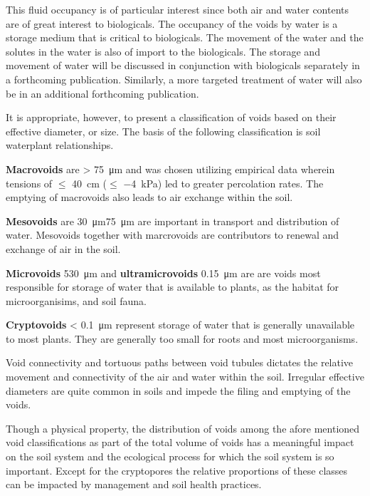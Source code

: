 \documentclass[a5paper]{report}
\begin{document}
This fluid occupancy is of particular interest since both air and water contents are of great interest to biologicals. The occupancy of the voids by water is a storage medium that is critical to biologicals. The movement of the water and the solutes in the water is also of import to the biologicals. The storage and movement of water will be discussed in conjunction with biologicals separately in a forthcoming publication. Similarly, a more targeted treatment of water will also be in an additional forthcoming publication.  

It is appropriate, however, to present a classification of voids based on their effective diameter, or size. The basis of the following classification is soil water\textemdash{}plant relationships.  

\textbf{Macrovoids} are \textgreater{} \SI{75}{\micro\metre} and was chosen utilizing empirical data wherein tensions of $\leq$ \SI{40}{\centi\metre} ($\leq$ \SI{-4}{kPa}) led to greater percolation rates. The emptying of macrovoids also leads to air exchange within the soil.  

\textbf{Mesovoids} are \SI{30}{\micro\metre}\textemdash \SI{75}{\micro\metre} are important in transport and distribution of water. Mesovoids together with marcrovoids are contributors to renewal and exchange of air in the soil.  

\textbf{Microvoids} \SI{5}{}\textemdash \SI{30}{\micro\metre} and \textbf{ultramicrovoids} \SI{0.1}{}\textemdash \SI{5}{\micro\metre} are are voids most responsible for storage of water that is available to plants, as the habitat for microorganisims, and soil fauna.  

\textbf{Cryptovoids} \textless{} \SI{0.1}{\micro\metre} represent storage of water that is generally unavailable to most plants. They are generally too small for roots and most microorganisms.  

Void connectivity and tortuous paths between void tubules dictates the relative movement and connectivity of the air and water within the soil. Irregular effective diameters are quite common in soils and impede the filing and emptying of the voids.  

Though a physical property, the distribution of voids among the afore mentioned void classifications as part of the total volume of voids has a meaningful impact on the soil system and the ecological process for which the soil system is so important. Except for the cryptopores the relative proportions of these classes can be impacted by management and soil health practices.  
\end{document}
